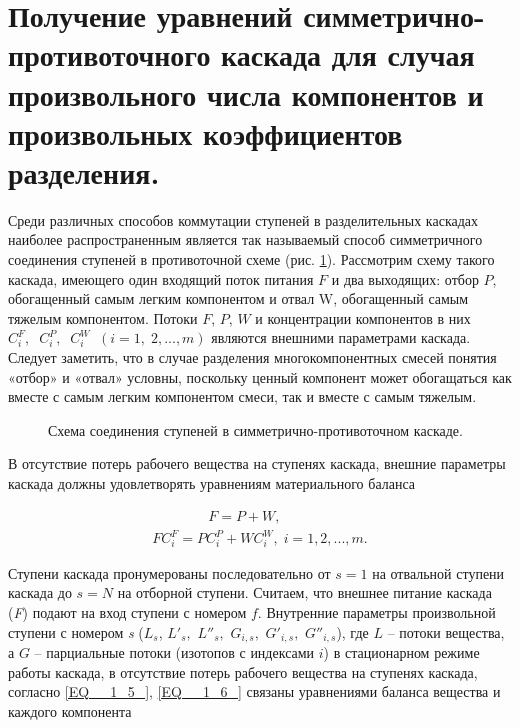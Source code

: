 \section{Получение уравнений симметрично-противоточного каскада для случая произвольного числа компонентов и произвольных коэффициентов разделения.}


Среди различных способов коммутации ступеней в разделительных каскадах наиболее распространенным является так называемый способ симметричного соединения ступеней в противоточной схеме (рис. \ref{1_2}). Рассмотрим схему такого каскада, имеющего один входящий поток питания $F$ и два выходящих: отбор $P$, обогащенный самым легким компонентом и отвал W, обогащенный самым тяжелым компонентом. Потоки $F$, $P$, $W$ и концентрации компонентов в них $C_{i}^{F} ,\; \; C_{i}^{P} ,\; \; C_{i}^{W} \; \; (i=1,\; 2,...,m)$ являются внешними параметрами каскада. Следует заметить, что в случае разделения многокомпонентных смесей понятия «отбор» и «отвал» условны, поскольку ценный компонент может обогащаться как вместе с самым легким компонентом смеси, так и вместе с самым тяжелым.

\begin{figure}[ht]
  \caption{Схема соединения ступеней в симметрично-противоточном каскаде.}\label{1_2}
\end{figure}

В отсутствие потерь рабочего вещества на ступенях каскада, внешние параметры каскада должны удовлетворять уравнениям материального баланса

\begin{equation} \label{EQ__1_21_} 
  \begin{array}{l} {\quad \quad \quad \quad F=P+W,} \\ {FC_{i}^{F} =PC_{i}^{P} +WC_{i}^{W} ,\; i=1,2,...,m.} \end{array} 
\end{equation} 

Ступени каскада пронумерованы последовательно от $s=1$ на отвальной ступени каскада до $s=N$ на отборной ступени. Считаем, что внешнее питание каскада (\textit{F}) подают на вход ступени с номером $f$. Внутренние параметры произвольной ступени с номером \textit{s} ($L_{s} $, $L'_{s} ,$ $L''_{s} ,$ $G_{i,s} ,$ $G'_{i,s} ,$ $G''_{i,s} $), где $L$ -- потоки вещества, а $G$ -- парциальные потоки (изотопов с индексами $i$) в стационарном режиме работы каскада, в отсутствие потерь рабочего вещества на ступенях каскада, согласно  \ref{EQ__1_5_},  \ref{EQ__1_6_} связаны уравнениями баланса вещества и каждого компонента

